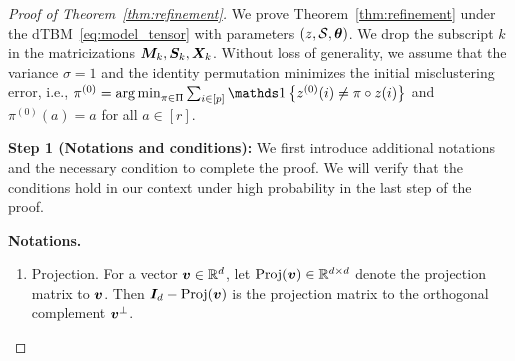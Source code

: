 \documentclass[lettersize,onecolumn,journal]{IEEEtran}
\theoremstyle{definition}
\theoremstyle{definition}
\newcommand{\offf}[1]{\left\{#1\right\}}
\begin{document}
\begin{proof}[Proof of Theorem~\ref{thm:refinement}]
We prove Theorem~\ref{thm:refinement} under the dTBM~\eqref{eq:model_tensor} with parameters $(z, \mathcal{S}, \boldsymbol{\theta})$. We drop the subscript $k$ in the matricizations $\bm M_k, \bm S_k, \bm X_k$. Without loss of generality, we assume that the variance $\sigma = 1$ and the identity permutation minimizes the initial misclustering error, i.e., $\pi^{(0)} = \argmin_{\pi \in \Pi} \sum_{i \in [p]}\ind \offf{z^{(0)}(i) \neq \pi \circ z(i) }$ and $\pi^{(0)}(a) = a$ for all $ a \in [r]$.



{\bf Step 1 (Notations and conditions):} We first introduce additional notations and the necessary condition to complete the proof. We will verify that the conditions hold in our context under high probability in the last step of the proof. 

\textbf{Notations.}
\begin{enumerate}

\item Projection. For a vector $\bm{v} \in \mathbb{R}^d$, let $\text{Proj}(\bm{v}) \in \mathbb{R}^{d \times d}$ denote the projection matrix to $\bm{v}$. Then $\bm I_d - \text{Proj}(\bm{v})$ is the projection matrix to the orthogonal complement $\bm{v}^{\perp}$. 


\end{enumerate}
\end{proof}
\end{document}
